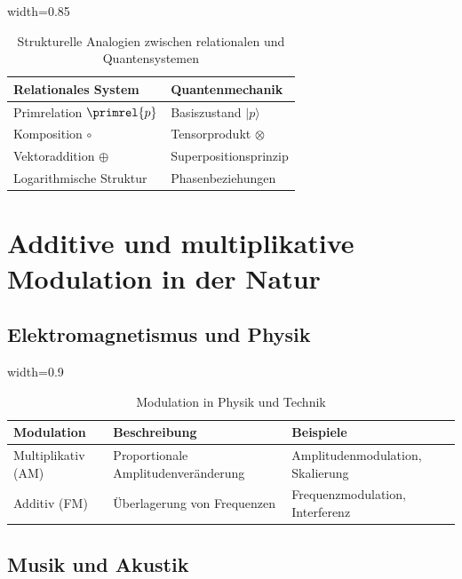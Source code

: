 	\begin{table}[htbp]
		\centering
		\begin{adjustbox}{width=0.85\textwidth}
			\begin{tabular}{ll}
				\toprule
				\textbf{Relationales System} & \textbf{Quantenmechanik} \\
				\midrule
				Primrelation $\primrel{p}$ & Basiszustand $|p\rangle$ \\
				Komposition $\circ$ & Tensorprodukt $\otimes$ \\
				Vektoraddition $\oplus$ & Superpositionsprinzip \\
				Logarithmische Struktur & Phasenbeziehungen \\
				\bottomrule
			\end{tabular}
		\end{adjustbox}
		\caption{Strukturelle Analogien zwischen relationalen und Quantensystemen}
		\label{tab:quantenanalogien}
	\end{table}
	
	\section{Additive und multiplikative Modulation in der Natur}
	
	\subsection{Elektromagnetismus und Physik}
	
	\begin{table}[htbp]
		\centering
		\begin{adjustbox}{width=0.9\textwidth}
			\begin{tabular}{lll}
				\toprule
				\textbf{Modulation} & \textbf{Beschreibung} & \textbf{Beispiele} \\
				\midrule
				Multiplikativ (AM) & Proportionale Amplitudenveränderung & Amplitudenmodulation, Skalierung \\
				Additiv (FM) & Überlagerung von Frequenzen & Frequenzmodulation, Interferenz \\
				\bottomrule
			\end{tabular}
		\end{adjustbox}
		\caption{Modulation in Physik und Technik}
		\label{tab:modulation}
	\end{table}
	
	\subsection{Musik und Akustik}
	
